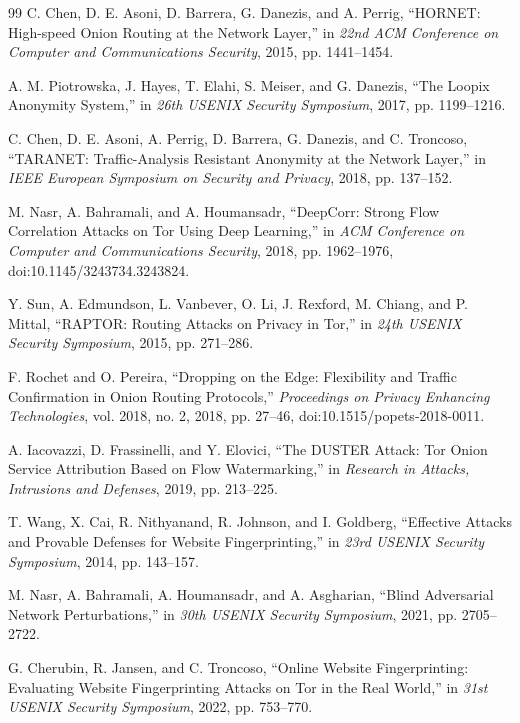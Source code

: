 \documentclass[11pt,oneside]{article}
\begin{document}
\begin{thebibliography}{99}
C. Chen, D. E. Asoni, D. Barrera, G. Danezis, and A. Perrig,
``HORNET: High-speed Onion Routing at the Network Layer,''
in \emph{22nd ACM Conference on Computer and Communications Security}, 2015, pp. 1441--1454.

A. M. Piotrowska, J. Hayes, T. Elahi, S. Meiser, and G. Danezis,
``The Loopix Anonymity System,''
in \emph{26th USENIX Security Symposium}, 2017, pp. 1199--1216.

C. Chen, D. E. Asoni, A. Perrig, D. Barrera, G. Danezis, and C. Troncoso,
``TARANET: Traffic-Analysis Resistant Anonymity at the Network Layer,''
in \emph{IEEE European Symposium on Security and Privacy}, 2018, pp. 137--152.

M. Nasr, A. Bahramali, and A. Houmansadr,
``DeepCorr: Strong Flow Correlation Attacks on Tor Using Deep Learning,''
in \emph{ACM Conference on Computer and Communications Security}, 2018, pp. 1962--1976,
doi:10.1145/3243734.3243824.

Y. Sun, A. Edmundson, L. Vanbever, O. Li, J. Rexford, M. Chiang, and P. Mittal,
``RAPTOR: Routing Attacks on Privacy in Tor,''
in \emph{24th USENIX Security Symposium}, 2015, pp. 271--286.

F. Rochet and O. Pereira,
``Dropping on the Edge: Flexibility and Traffic Confirmation in Onion Routing Protocols,''
\emph{Proceedings on Privacy Enhancing Technologies}, vol. 2018, no. 2, 2018, pp. 27--46,
doi:10.1515/popets-2018-0011.

A. Iacovazzi, D. Frassinelli, and Y. Elovici,
``The DUSTER Attack: Tor Onion Service Attribution Based on Flow Watermarking,''
in \emph{Research in Attacks, Intrusions and Defenses}, 2019, pp. 213--225.

T. Wang, X. Cai, R. Nithyanand, R. Johnson, and I. Goldberg,
``Effective Attacks and Provable Defenses for Website Fingerprinting,''
in \emph{23rd USENIX Security Symposium}, 2014, pp. 143--157.

M. Nasr, A. Bahramali, A. Houmansadr, and A. Asgharian,
``Blind Adversarial Network Perturbations,''
in \emph{30th USENIX Security Symposium}, 2021, pp. 2705--2722.

G. Cherubin, R. Jansen, and C. Troncoso,
``Online Website Fingerprinting: Evaluating Website Fingerprinting Attacks on Tor in the Real World,''
in \emph{31st USENIX Security Symposium}, 2022, pp. 753--770.


\end{thebibliography}
\end{document}
